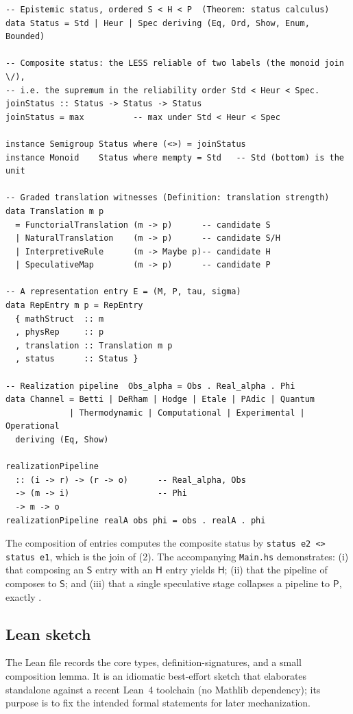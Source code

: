 \documentclass[12pt]{article}
\theoremstyle{definition}
\theoremstyle{remark}
\newcommand{\Sstat}{\mathsf{S}}
\newcommand{\Hstat}{\mathsf{H}}
\newcommand{\Pstat}{\mathsf{P}}
\begin{document}
{\footnotesize
\begin{verbatim}
-- Epistemic status, ordered S < H < P  (Theorem: status calculus)
data Status = Std | Heur | Spec deriving (Eq, Ord, Show, Enum, Bounded)

-- Composite status: the LESS reliable of two labels (the monoid join \/),
-- i.e. the supremum in the reliability order Std < Heur < Spec.
joinStatus :: Status -> Status -> Status
joinStatus = max          -- max under Std < Heur < Spec

instance Semigroup Status where (<>) = joinStatus
instance Monoid    Status where mempty = Std   -- Std (bottom) is the unit

-- Graded translation witnesses (Definition: translation strength)
data Translation m p
  = FunctorialTranslation (m -> p)      -- candidate S
  | NaturalTranslation    (m -> p)      -- candidate S/H
  | InterpretiveRule      (m -> Maybe p)-- candidate H
  | SpeculativeMap        (m -> p)      -- candidate P

-- A representation entry E = (M, P, tau, sigma)
data RepEntry m p = RepEntry
  { mathStruct  :: m
  , physRep     :: p
  , translation :: Translation m p
  , status      :: Status }

-- Realization pipeline  Obs_alpha = Obs . Real_alpha . Phi
data Channel = Betti | DeRham | Hodge | Etale | PAdic | Quantum
             | Thermodynamic | Computational | Experimental | Operational
  deriving (Eq, Show)

realizationPipeline
  :: (i -> r) -> (r -> o)      -- Real_alpha, Obs
  -> (m -> i)                  -- Phi
  -> m -> o
realizationPipeline realA obs phi = obs . realA . phi
\end{verbatim}
}

The composition of entries computes the composite status by
\verb|status e2 <> status e1|, which is the join of (2). The
accompanying \verb|Main.hs| demonstrates: (i) that composing an $\Sstat$ entry
with an $\Hstat$ entry yields $\Hstat$; (ii) that the pipeline of
 composes to $\Sstat$; and (iii) that a single speculative stage
collapses a pipeline to $\Pstat$, exactly .

\subsection{Lean sketch}

The Lean file records the core types, definition-signatures, and a small
composition lemma. It is an idiomatic best-effort sketch that elaborates
standalone against a recent Lean~4 toolchain (no Mathlib dependency); its
purpose is to fix the intended formal statements for later mechanization.
\end{document}
